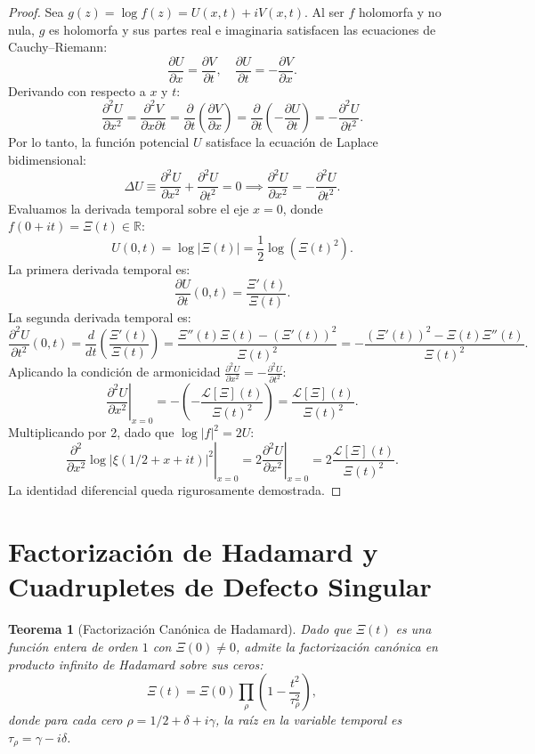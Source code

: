 \documentclass[11pt,a4paper]{article}
\newtheorem{theorem}{Teorema}[section]
\theoremstyle{definition}
\theoremstyle{remark}
\begin{document}
\begin{proof}
Sea $g(z) = \log f(z) = U(x, t) + i V(x, t)$. Al ser $f$ holomorfa y no nula, $g$ es holomorfa y sus partes real e imaginaria satisfacen las ecuaciones de Cauchy--Riemann:
\[
\frac{\partial U}{\partial x} = \frac{\partial V}{\partial t}, \quad \frac{\partial U}{\partial t} = -\frac{\partial V}{\partial x}.
\]
Derivando con respecto a $x$ y $t$:
\[
\frac{\partial^2 U}{\partial x^2} = \frac{\partial^2 V}{\partial x \partial t} = \frac{\partial}{\partial t}\left(\frac{\partial V}{\partial x}\right) = \frac{\partial}{\partial t}\left(-\frac{\partial U}{\partial t}\right) = -\frac{\partial^2 U}{\partial t^2}.
\]
Por lo tanto, la función potencial $U$ satisface la ecuación de Laplace bidimensional:
\[
\Delta U \equiv \frac{\partial^2 U}{\partial x^2} + \frac{\partial^2 U}{\partial t^2} = 0 \implies \frac{\partial^2 U}{\partial x^2} = -\frac{\partial^2 U}{\partial t^2}.
\]
Evaluamos la derivada temporal sobre el eje $x = 0$, donde $f(0+it) = \Xi(t) \in \mathbb{R}$:
\[
U(0, t) = \log |\Xi(t)| = \frac{1}{2}\log (\Xi(t)^2).
\]
La primera derivada temporal es:
\[
\frac{\partial U}{\partial t}(0, t) = \frac{\Xi'(t)}{\Xi(t)}.
\]
La segunda derivada temporal es:
\[
\frac{\partial^2 U}{\partial t^2}(0, t) = \frac{d}{dt}\left(\frac{\Xi'(t)}{\Xi(t)}\right) = \frac{\Xi''(t)\Xi(t) - (\Xi'(t))^2}{\Xi(t)^2} = -\frac{(\Xi'(t))^2 - \Xi(t)\Xi''(t)}{\Xi(t)^2}.
\]
Aplicando la condición de armonicidad $\frac{\partial^2 U}{\partial x^2} = -\frac{\partial^2 U}{\partial t^2}$:
\[
\left.\frac{\partial^2 U}{\partial x^2}\right|_{x=0} = -\left(-\frac{\mathcal{L}[\Xi](t)}{\Xi(t)^2}\right) = \frac{\mathcal{L}[\Xi](t)}{\Xi(t)^2}.
\]
Multiplicando por 2, dado que $\log |f|^2 = 2U$:
\[
\left.\frac{\partial^2}{\partial x^2}\log |\xi(1/2 + x + it)|^2\right|_{x=0} = 2 \left.\frac{\partial^2 U}{\partial x^2}\right|_{x=0} = 2 \frac{\mathcal{L}[\Xi](t)}{\Xi(t)^2}.
\]
La identidad diferencial queda rigurosamente demostrada.
\end{proof}

\section{Factorización de Hadamard y Cuadrupletes de Defecto Singular}

\begin{theorem}[Factorización Canónica de Hadamard]
Dado que $\Xi(t)$ es una función entera de orden $1$ con $\Xi(0) \neq 0$, admite la factorización canónica en producto infinito de Hadamard sobre sus ceros:
\begin{equation}
\Xi(t) = \Xi(0) \prod_{\rho} \left(1 - \frac{t^2}{\tau_\rho^2}\right),
\end{equation}
donde para cada cero $\rho = 1/2 + \delta + i\gamma$, la raíz en la variable temporal es $\tau_\rho = \gamma - i\delta$.
\end{theorem}
\end{document}
